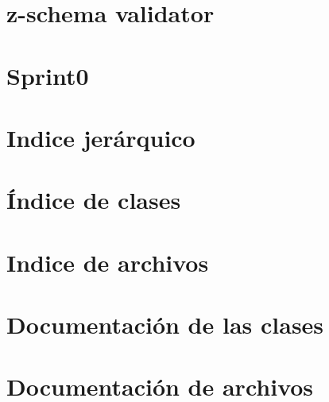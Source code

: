 \documentclass[twoside]{book}
\newcommand{\+}{\discretionary{\mbox{\scriptsize$\hookleftarrow$}}{}{}}
\newcommand{\clearemptydoublepage}{%
    \newpage{\pagestyle{empty}\cleardoublepage}%
  }
\begin{document}
\chapter{z-\/schema validator}
\label{md_src_nodejs_node_modules_z_schema_README}

\chapter{Sprint0}
\label{md_src_README}

\chapter{Indice jerárquico}

\chapter{Índice de clases}

\chapter{Indice de archivos}

\chapter{Documentación de las clases}
















\chapter{Documentación de archivos}












  \backmatter
  \newpage
  \clearemptydoublepage
  \printindex
\end{document}
